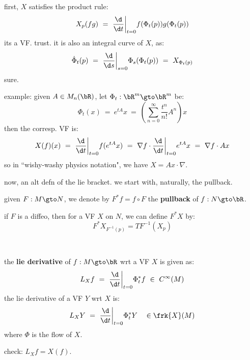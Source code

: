 \begin{pf}
	first, $X$ satisfies the product rule:
	\begin{equation*}
		X_{p}(fg) \ = \ \frac{\d}{\d t}\bigg\rvert_{t=0}f(\Phi_{t}(p))g(\Phi_{t}(p))
	\end{equation*}
	its a VF. trust. it is also an integral curve of $X$, as:
	\begin{equation*}
		\dot{\Phi}_{t}(p) \ = \ \frac{\d}{\d s}\bigg\rvert_{s=0}\Phi_{s}(\Phi_{t}(p)) \ = \ X_{\Phi_{t}(p)}
	\end{equation*}
	sure.
\end{pf}

example: given $A\in M_{n}(\bR)$, let $\Phi_{t}:\bR^{m}\gto\bR^{m}$ be:
\begin{equation*}
	\Phi_{t}(x) \ = \ e^{tA}x \ = \ \left(\sum_{n=0}^{\infty}\frac{t^{n}}{n!}A^{n}\right)x
\end{equation*}
then the corresp. VF is:
\begin{equation*}
	X(f)(x) \ = \ \frac{\d}{\d t}\bigg\rvert_{t=0}f(e^{tA}x)
	\ = \ \nabla f\cdot\frac{\d}{\d t}\bigg\rvert_{t=0}e^{tA}x
	\ = \ \nabla f\cdot Ax
\end{equation*}
so in ``wishy-washy physics notation", we have $X=Ax\cdot\nabla$.

now, an alt defn of the lie bracket.
we start with, naturally, the pullback.

\begin{defn}
	given $F:M\gto N$, we denote by $F^{*}f=f\circ F$ the \textbf{pullback} of $f:N\gto\bR$.

	if $F$ is a diffeo, then for a VF $X$ on $N$, we can define $F^{*}X$ by:
	\begin{equation*}
		F^{*}X_{F^{-1}(p)}=TF^{-1}(X_{p})
	\end{equation*}
\end{defn} \

\begin{defn}
	the \textbf{lie derivative} of $f:M\gto\bR$ wrt a VF $X$ is given as:
	\begin{equation*}
		L_{X}f \ = \ \frac{\d}{\d t}\bigg\rvert_{t=0}\Phi_{t}^{*}f \ \in \ C^{\infty}(M)
	\end{equation*}
	the lie derivative of a VF $Y$ wrt $X$ is:
	\begin{equation*}
		L_{X}Y \ = \ \frac{\d}{\d t}\bigg\rvert_{t=0}\Phi_{t}^{*}Y \quad \in \frk{X}(M)
	\end{equation*}
	where $\Phi$ is the flow of $X$.
\end{defn}
check: $L_{X}f=X(f)$.


